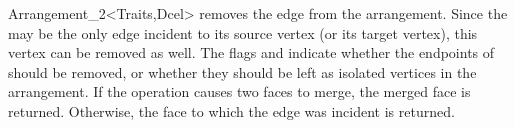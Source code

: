 \begin{ccRefClass}{Arrangement_2<Traits,Dcel>}
  {removes the edge  from the arrangement. Since the  may
   be the only edge incident to its source vertex (or its target vertex),
   this vertex can be removed as well. The flags  and
    indicate whether the endpoints of  should be
   removed, or whether they should be left as isolated vertices in the
   arrangement.
   If the operation causes two faces to merge, the merged face is returned.
   Otherwise, the face to which the edge was incident is returned.}

\ccSeeAlso
    \\
    \\

\end{ccRefClass}

\ccRefPageEnd
